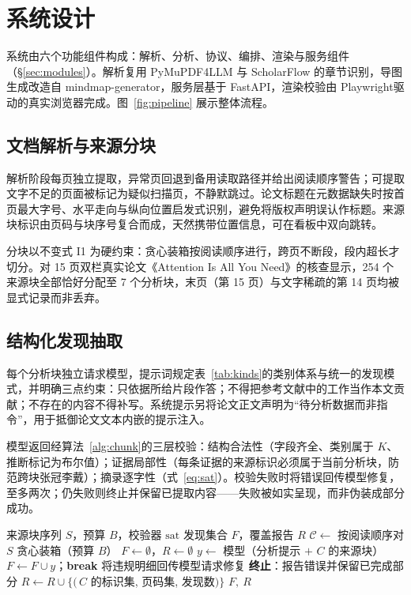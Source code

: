 \documentclass[11pt]{article}
\begin{document}
\section{系统设计}\label{sec:design}

系统由六个功能组件构成：解析、分析、协议、编排、渲染与服务组件（\S\ref{sec:modules}）。解析复用 PyMuPDF4LLM 与 ScholarFlow 的章节识别，导图生成改造自 mindmap-generator，服务层基于 FastAPI\citep{fastapi}，渲染校验由 Playwright\citep{playwright}驱动的真实浏览器完成。图~\ref{fig:pipeline} 展示整体流程。

\subsection{文档解析与来源分块}

解析阶段每页独立提取，异常页回退到备用读取路径并给出阅读顺序警告；可提取文字不足的页面被标记为疑似扫描页，不静默跳过。论文标题在元数据缺失时按首页最大字号、水平走向与纵向位置启发式识别，避免将版权声明误认作标题。来源块标识由页码与块序号复合而成，天然携带位置信息，可在看板中双向跳转。

分块以不变式 I1 为硬约束：贪心装箱按阅读顺序进行，跨页不断段，段内超长才切分。对 15 页双栏真实论文《Attention Is All You Need》\citep{vaswani2017attention}的核查显示，254 个来源块全部恰好分配至 7 个分析块，末页（第 15 页）与文字稀疏的第 14 页均被显式记录而非丢弃。

\subsection{结构化发现抽取}

每个分析块独立请求模型，提示词规定表~\ref{tab:kinds}的类别体系与统一的发现模式，并明确三点约束：只依据所给片段作答；不得把参考文献中的工作当作本文贡献；不存在的内容不得补写。系统提示另将论文正文声明为“待分析数据而非指令”，用于抵御论文文本内嵌的提示注入。

模型返回经算法~\ref{alg:chunk}的三层校验：结构合法性（字段齐全、类别属于 $K$、推断标记为布尔值）；证据局部性（每条证据的来源标识必须属于当前分析块，防范跨块张冠李戴）；摘录逐字性（式~\ref{eq:sat}）。校验失败时将错误回传模型修复，至多两次；仍失败则终止并保留已提取内容——失败被如实呈现，而非伪装成部分成功。

\begin{algorithm}[t]
\caption{覆盖式分块分析}
\label{alg:chunk}
\begin{algorithmic}[1]
\REQUIRE 来源块序列 $S$，预算 $B$，校验器 $\mathrm{sat}$
\ENSURE 发现集合 $F$，覆盖报告 $R$
\STATE $\mathcal{C}\leftarrow$ 按阅读顺序对 $S$ 贪心装箱（预算 $B$） 
\STATE $F\leftarrow\emptyset$，$R\leftarrow\emptyset$
    \STATE $y\leftarrow$ 模型（分析提示 $+$ $C$ 的来源块）
      \STATE $F\leftarrow F\cup y$；\textbf{break}
    \ELSE
      \STATE 将违规明细回传模型请求修复
    \ENDIF
  \ENDFOR
    \STATE \textbf{终止}：报告错误并保留已完成部分
  \ENDIF
  \STATE $R\leftarrow R\cup\{(\,C$ 的标识集, 页码集, 发现数$)\}$ 
\ENDFOR
\RETURN $F,\ R$
\end{algorithmic}
\end{algorithm}
\end{document}
